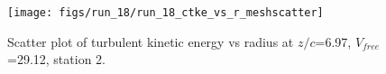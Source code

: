 \begin{figure}[H]
\centering
\texttt{[image: figs/run\_18/run\_18\_ctke\_vs\_r\_meshscatter]}
\caption{Scatter plot of turbulent kinetic energy vs radius at $z/c$=6.97, $V_{free}$=29.12, station 2.}
\label{fig:run_18_ctke_vs_r_meshscatter}
\end{figure}


